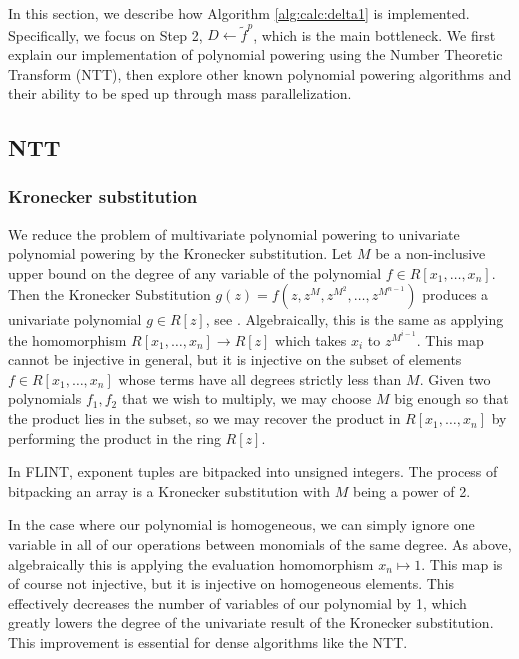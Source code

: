In this section, we describe how Algorithm \ref{alg:calc:delta1} 
is implemented. Specifically, we focus on Step 2, 
\(D \gets \tilde{f}^{p}\), which is the main 
bottleneck. We first explain our implementation 
of polynomial powering using the Number Theoretic 
Transform (NTT), then explore other known polynomial 
powering algorithms and their ability to be sped up 
through mass parallelization.

\subsection{NTT}


\subsubsection{Kronecker substitution}
We reduce the problem of multivariate 
polynomial powering to univariate polynomial powering
by the Kronecker substitution.
Let $M$ be a non-inclusive upper bound on the degree of any variable of the polynomial
$f \in R[x_1, \dots, x_n]$. 
Then the Kronecker Substitution 
\(g(z) = f(z, z^M, z^{M^2}, \dots, z^{M^{n-1}})\)
produces a univariate polynomial $g \in R[z]$,
see \cite{arnold-2014-kronecker}.
Algebraically, this is the same as applying the 
homomorphism 
\(R[x_{1}, \ldots, x_{n}] \xrightarrow{} R[z]\)
which takes \(x_{i}\) to
\(z^{M^{i-1}}\).
This map cannot be injective in general, but it
is injective on the subset of elements 
\(f \in R[x_{1}, \ldots, x_{n}]\) 
whose terms have all degrees strictly less than \(M\).
Given two polynomials \(f_{1}, f_{2}\) that
we wish to multiply, we may choose \(M\)
big enough
so that the product lies in the subset,
so we may recover the product in 
\(R[x_{1}, \ldots, x_{n}]\) by performing
the product in the ring \(R[z]\).

\begin{rmk}
    In FLINT, exponent tuples are bitpacked into unsigned 
    integers. The process of bitpacking an array is a 
    Kronecker substitution with $M$ being a power of 2.
\end{rmk}

In the case where our polynomial is homogeneous, 
we can simply ignore one variable in all of our 
operations between monomials of the same degree. 
As above, algebraically this is applying the evaluation
homomorphism \(x_{n} \mapsto 1\).
This map is of course not injective, but it is injective on homogeneous elements.
This effectively decreases the number of variables of our polynomial by 1, 
which greatly lowers the degree of the univariate result of the
Kronecker substitution.
This improvement is essential for dense algorithms like the NTT.

